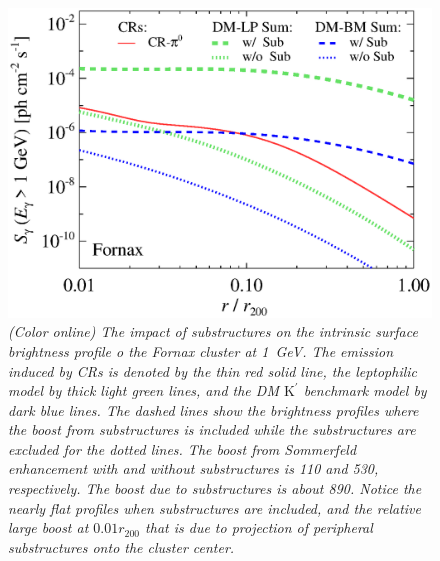 \documentclass[10pt,aps,pra,reprint,amsmath,amsfonts,amssymb,showpacs,nofootinbib,floatfix]{revtex4-1}
\newcommand{\rmn}{\mathrm}
\newcommand{\Kp}{\rmn{K}^\prime}
\newcommand{\rvir}{r_{200}}
\begin{document}
\begin{figure}%
 \includegraphics[width=0.99\columnwidth]{figures/SB.resolved.v14.1GeV.SF700.noSuB.vs.SubMass.elmu.bw.eps}
 \caption{\it (Color online) The impact of substructures on the
   intrinsic surface brightness profile o the Fornax cluster at
   1~GeV. The emission induced by CRs is denoted by the thin red solid
   line, the leptophilic model by thick light green lines, and the DM
   $\Kp$ benchmark model by dark blue lines. The dashed lines show the
   brightness profiles where the boost from substructures is included
   while the substructures are excluded for the dotted lines. The
   boost from Sommerfeld enhancement with and without substructures is
   110 and 530, respectively. The boost due to substructures is about
   890. Notice the nearly flat profiles when substructures are
   included, and the relative large boost at $0.01\rvir$ that is due
   to projection of peripheral substructures onto the cluster center.}
 \label{fig:SB_sub}
\end{figure}
\end{document}
